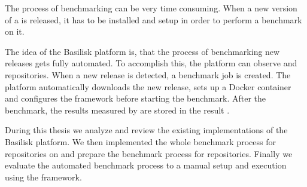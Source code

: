 The process of benchmarking \tsp{} can be very time consuming.
When a new version of a \ts{} is released, it has to be installed and setup in order to perform a benchmark on it.

The idea of the Basilisk platform is, that the process of benchmarking new \ts{} releases gets fully automated.
To accomplish this, the platform can observe \dockh{} and \gh{} repositories.
When a new release is detected, a benchmark job is created.
The platform automatically downloads the new release, sets up a Docker container and configures the \iguana{} framework before starting the benchmark.
After the benchmark, the results measured by \iguana{} are stored in the result \ts{}.

During this thesis we analyze and review the existing implementations of the Basilisk platform.
We then implemented the whole benchmark process for repositories on \dockh{} and prepare the benchmark process for \gh{} repositories.
Finally we evaluate the automated benchmark process to a manual setup and execution using the \iguana{} framework.

